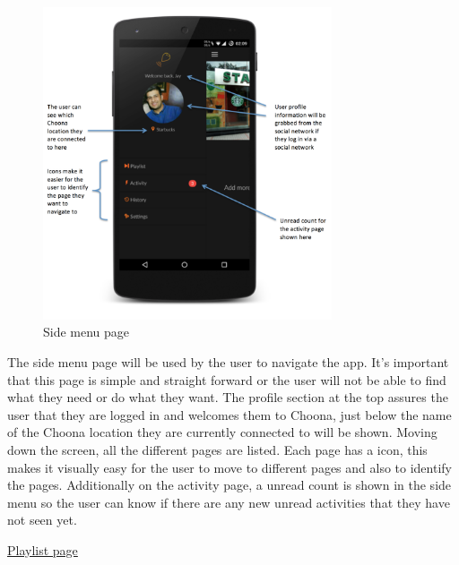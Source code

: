 \noindent
\begin{figure}[h!]
\centering
\includegraphics[width=0.76\textwidth]{./img/sidemenuannotated.png}
\caption{Side menu page}
\label{fig:sidemenu}
\end{figure}

The side menu page will be used by the user to navigate the app. It's important that this page is simple and straight forward or the user will not be able to find what they need or do what they want. The profile section at the top assures the user that they are logged in and welcomes them to Choona, just below the name of the Choona location they are currently connected to will be shown. Moving down the screen, all the different pages are listed. Each page has a icon, this makes it visually easy for the user to move to different pages and also to identify the pages. Additionally on the activity page, a unread count is shown in the side menu so the user can know if there are any new unread activities that they have not seen yet.\\

\clearpage

\noindent\underline{Playlist page}\newline

